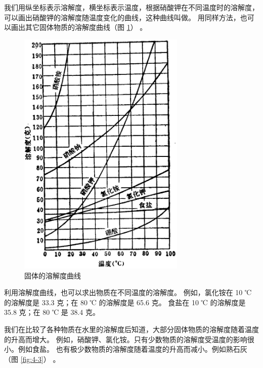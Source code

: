 我们用纵坐标表示溶解度，横坐标表示温度，根据硝酸钾在不同温度时的溶解度，
可以画出硝酸钾的溶解度随温度变化的曲线，这种曲线叫做。
用同样方法，也可以画出其它固体物质的溶解度曲线（图 \ref{fig:4-2}） 。

\begin{figure}[htbp]
    \centering
    \includegraphics[width=8cm]{../pic/czhx1-ch4-2}
    \caption{固体的溶解度曲线}\label{fig:4-2}
\end{figure}

利用溶解度曲线，也可以求出物质在不同温度的溶解度。
例如，氯化铵在 10 ℃ 的溶解度是 33.3 克；在 80 ℃ 的溶解度是 65.6 克。
食盐在 10 ℃ 的溶解度是 35.8 克；在 80 ℃ 是 38.4 克。

我们在比较了各种物质在水里的溶解度后知道，大部分固体物质的溶解度随着温度的升高而增大。
例如，硝酸钾、氯化铵。只有少数物质的溶解度受温度的影响很小。例如食盐。
也有极少数物质的溶解度随着温度的升高而减小。例如熟石灰（图 \ref{fig:4-3}） 。

